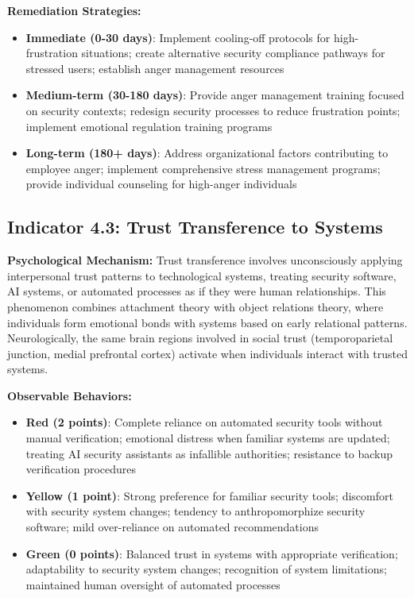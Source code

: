 \documentclass[11pt,a4paper]{article}
\begin{document}
\textbf{Remediation Strategies:}
\begin{itemize}
\item \textbf{Immediate (0-30 days)}: Implement cooling-off protocols for high-frustration situations; create alternative security compliance pathways for stressed users; establish anger management resources
\item \textbf{Medium-term (30-180 days)}: Provide anger management training focused on security contexts; redesign security processes to reduce frustration points; implement emotional regulation training programs
\item \textbf{Long-term (180+ days)}: Address organizational factors contributing to employee anger; implement comprehensive stress management programs; provide individual counseling for high-anger individuals
\end{itemize}

\subsection{Indicator 4.3: Trust Transference to Systems}

\textbf{Psychological Mechanism:}
Trust transference involves unconsciously applying interpersonal trust patterns to technological systems, treating security software, AI systems, or automated processes as if they were human relationships. This phenomenon combines attachment theory with object relations theory, where individuals form emotional bonds with systems based on early relational patterns. Neurologically, the same brain regions involved in social trust (temporoparietal junction, medial prefrontal cortex) activate when individuals interact with trusted systems\cite{riedl2014}.

\textbf{Observable Behaviors:}
\begin{itemize}
\item \textbf{Red (2 points)}: Complete reliance on automated security tools without manual verification; emotional distress when familiar systems are updated; treating AI security assistants as infallible authorities; resistance to backup verification procedures
\item \textbf{Yellow (1 point)}: Strong preference for familiar security tools; discomfort with security system changes; tendency to anthropomorphize security software; mild over-reliance on automated recommendations
\item \textbf{Green (0 points)}: Balanced trust in systems with appropriate verification; adaptability to security system changes; recognition of system limitations; maintained human oversight of automated processes
\end{itemize}
\end{document}
